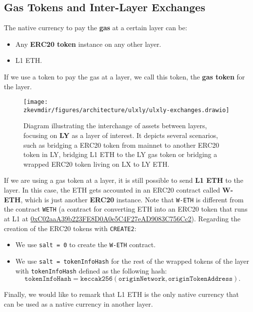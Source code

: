 
\subsection{Gas Tokens and Inter-Layer Exchanges}

The native currency to pay the \textbf{gas} at a certain layer can be:

  \begin{itemize}

  \item Any \textbf{ERC20 token} instance on any other layer.
  \item L1 ETH.

  \end{itemize}

If we use a token to pay the gas at a layer, we call this token, the \textbf{gas token} for the layer.


\begin{figure}[H]
\centering
\texttt{[image: \\zkevmdir/figures/architecture/ulxly/ulxly-exchanges.drawio]}
\caption{Diagram illustrating the interchange of assets between layers, focusing on \textbf{LY} as a layer of interest. It depicts several scenarios, such as bridging a ERC20 token from mainnet to another ERC20 token in LY, bridging L1 ETH to the LY gas token or bridging a wrapped ERC20 token living on LX to LY ETH. }
\label{fig:inter-layer-exchanges}
\end{figure}


If we are using a gas token at a layer, it is still possible to send \textbf{L1 ETH} to the layer. In this case, the ETH gets accounted in an ERC20 contract called \textbf{W-ETH}, which is just another \textbf{ERC20} instance. Note that \texttt{W-ETH} is different from the contract \texttt{WETH} (a contract for converting ETH into an ERC20 token that runs at L1 at \href{https://etherscan.io/token/0xc02aaa39b223fe8d0a0e5c4f27ead9083c756cc2\#code}{0xC02aaA39b223FE8D0A0e5C4F27eAD9083C756Cc2}). Regarding the creation of the ERC20 tokens with \texttt{CREATE2}:

\begin{itemize}
\item We use \texttt{salt = 0} to create the \texttt{W-ETH} contract.
\item We use \texttt{salt = tokenInfoHash} for the rest of the wrapped tokens of the layer with \texttt{tokenInfoHash} defined as the following hash:
\[
\texttt{tokenInfoHash} = \texttt{keccak256}(\texttt{originNetwork}, \texttt{originTokenAddress}).
\]
\end{itemize}
Finally, we would like to remark that L1 ETH is the only native currency that can be used as a native currency in another layer.


